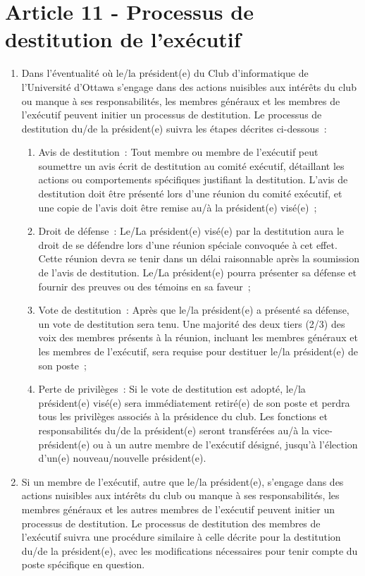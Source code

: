 \section*{Article 11 - Processus de destitution de l'exécutif}

\begin{enumerate}
    \item Dans l'éventualité où le/la président(e) du Club d'informatique de l'Université d'Ottawa s'engage dans des actions nuisibles aux intérêts du club ou manque à ses responsabilités, les membres généraux et les membres de l'exécutif peuvent initier un processus de destitution. Le processus de destitution du/de la président(e) suivra les étapes décrites ci-dessous~:

    \begin{enumerate}
        \item Avis de destitution~: Tout membre ou membre de l'exécutif peut soumettre un avis écrit de destitution au comité exécutif, détaillant les actions ou comportements spécifiques justifiant la destitution. L'avis de destitution doit être présenté lors d'une réunion du comité exécutif, et une copie de l'avis doit être remise au/à la président(e) visé(e)~;

        \item Droit de défense~: Le/La président(e) visé(e) par la destitution aura le droit de se défendre lors d'une réunion spéciale convoquée à cet effet. Cette réunion devra se tenir dans un délai raisonnable après la soumission de l'avis de destitution. Le/La président(e) pourra présenter sa défense et fournir des preuves ou des témoins en sa faveur~;

        \item Vote de destitution~: Après que le/la président(e) a présenté sa défense, un vote de destitution sera tenu. Une majorité des deux tiers (2/3) des voix des membres présents à la réunion, incluant les membres généraux et les membres de l'exécutif, sera requise pour destituer le/la président(e) de son poste~;

        \item Perte de privilèges~: Si le vote de destitution est adopté, le/la président(e) visé(e) sera immédiatement retiré(e) de son poste et perdra tous les privilèges associés à la présidence du club. Les fonctions et responsabilités du/de la président(e) seront transférées au/à la vice-président(e) ou à un autre membre de l'exécutif désigné, jusqu'à l'élection d'un(e) nouveau/nouvelle président(e).
    \end{enumerate}


    \item Si un membre de l'exécutif, autre que le/la président(e), s'engage dans des actions nuisibles aux intérêts du club ou manque à ses responsabilités, les membres généraux et les autres membres de l'exécutif peuvent initier un processus de destitution. Le processus de destitution des membres de l'exécutif suivra une procédure similaire à celle décrite pour la destitution du/de la président(e), avec les modifications nécessaires pour tenir compte du poste spécifique en question.
\end{enumerate}

